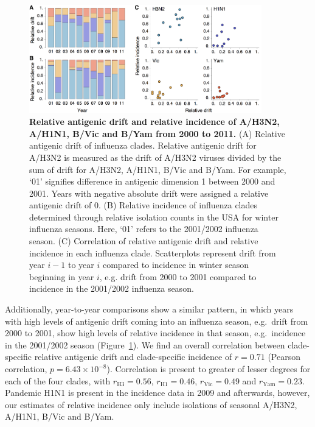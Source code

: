 \documentclass[11pt,oneside,letterpaper]{article}
\begin{document}
\begin{figure}[tb]
	\centering		
	\includegraphics[width=0.9\textwidth]{figures/incidence}
	\caption{\textbf{Relative antigenic drift and relative incidence of A/H3N2, A/H1N1, B/Vic and B/Yam from 2000 to 2011.} 
	(A) Relative antigenic drift of influenza clades.
	Relative antigenic drift for A/H3N2 is measured as the drift of A/H3N2 viruses divided by the sum of drift for A/H3N2, A/H1N1, B/Vic and B/Yam.
	For example, `01' signifies difference in antigenic dimension 1 between 2000 and 2001.
	Years with negative absolute drift were assigned a relative antigenic drift of 0.
	(B) Relative incidence of influenza clades determined through relative isolation counts in the USA for winter influenza seasons.
	Here, `01' refers to the 2001/2002 influenza season.
	(C) Correlation of relative antigenic drift and relative incidence in each influenza clade.
	Scatterplots represent drift from year $i-1$ to year $i$ compared to incidence in winter season beginning in year $i$, e.g. drift from 2000 to 2001 compared to incidence in the 2001/2002 influenza season.
	} 
	\label{incidence} 
\end{figure}

Additionally, year-to-year comparisons show a similar pattern, in which years with high levels of antigenic drift coming into an influenza season, e.g.\ drift from 2000 to 2001, show high levels of relative incidence in that season, e.g.\ incidence in the 2001/2002 season (Figure~\ref{incidence}). 
We find an overall correlation between clade-specific relative antigenic drift and clade-specific incidence of $r = 0.71$ (Pearson correlation, $p = 6.43 \times 10^{-8}$).
Correlation is present to greater of lesser degrees for each of the four clades, with $r_\mathrm{H3} = 0.56$, $r_\mathrm{H1} = 0.46$, $r_\mathrm{Vic} = 0.49$ and $r_\mathrm{Yam} = 0.23$.
Pandemic H1N1 is present in the incidence data in 2009 and afterwards, however, our estimates of relative incidence only include isolations of seasonal A/H3N2, A/H1N1, B/Vic and B/Yam.
\end{document}
